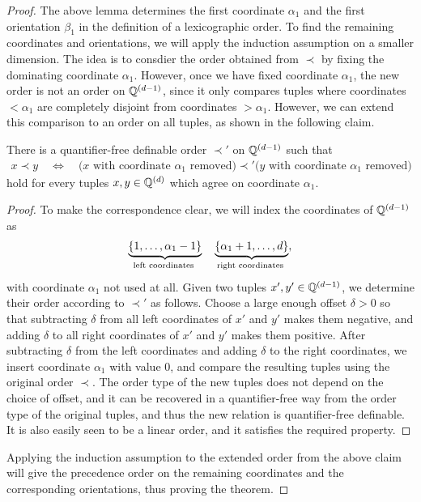 \begin{proof}

The above lemma  determines the first coordinate $\alpha_1$ and the first orientation $\beta_1$ in the definition of a lexicographic order. To find the remaining coordinates and orientations, we will apply the induction assumption on a smaller dimension.  The idea is to consdier the order obtained from $\prec$ by fixing the dominating coordinate  $\alpha_1$. However,  once we have fixed coordinate $\alpha_1$, the new order is not an order on ${\mathbb Q}^{(d-1)}$, since it  only compares tuples where coordinates $<\alpha_1$ are completely disjoint from coordinates $>\alpha_1$.  However, we can extend this comparison to an order on all tuples, as shown in the following claim. 

\begin{claim}\label{claim:extend-rational-order}
    There is a quantifier-free definable order  $\prec'$ on ${\mathbb Q}^{(d-1)}$ such that 
    \begin{align*}
    x \prec y \quad \iff \quad \text{($x$ with coordinate $\alpha_1$ removed)} \prec' \text{($y$ with coordinate $\alpha_1$ removed)}
    \end{align*}
    hold for every tuples $x,y \in {\mathbb Q}^{(d)}$ which agree on coordinate $\alpha_1$.
\end{claim}
\begin{proof}
    To make the correspondence clear, we will index the coordinates of ${\mathbb Q}^{(d-1)}$ as
    \begin{align*}
    \myunderbrace{\set{1,\ldots,\alpha_1-1}}{left coordinates} 
    \quad 
    \myunderbrace{\set{\alpha_1+1,\ldots,d}}{right coordinates},
    \end{align*}
    with coordinate $\alpha_1$ not used at all. Given two tuples $x', y' \in {\mathbb Q}^{(d-1)}$, we determine their order according to $\prec'$ as follows. Choose a large enough offset $\delta > 0$ so that subtracting $\delta$ from all left coordinates of $x'$ and $y'$ makes them negative, and adding $\delta$ to all right coordinates of $x'$ and $y'$ makes them positive. After subtracting $\delta$ from the left coordinates and adding $\delta$ to the right coordinates, we  insert coordinate $\alpha_1$ with value $0$, and compare the resulting tuples  using the original order $\prec$. The order type of the new tuples does not depend on the choice of offset, and it can be recovered in a quantifier-free way from the order type of the original tuples, and thus the new relation is quantifier-free definable. It is also easily seen to be a linear order, and it satisfies the required property.
\end{proof}
Applying the induction assumption to the extended order from the above claim will give the precedence order on the remaining coordinates and the corresponding orientations, thus proving the theorem.
    \end{proof}
